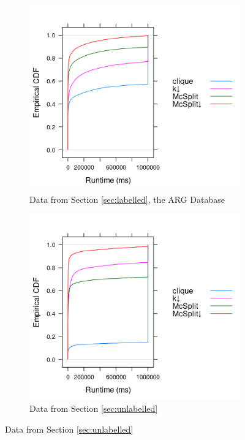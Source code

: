 \documentclass{l4proj}
\theoremstyle{definition}
\theoremstyle{remark}
\begin{document}
\begin{figure} %
  \centering
  \begin{subfigure}[t]{0.49\textwidth}
    \centering
    \includegraphics[scale=0.7]{images/ecdf_mcs.png}
    \caption{Data from Section \ref{sec:labelled}, the ARG Database}
    \label{fig:ecdf_unlabelled_mcs}
  \end{subfigure}
  \begin{subfigure}[t]{0.49\textwidth}
    \centering
    \includegraphics[scale=0.7]{images/ecdf_sip.png}
    \caption{Data from Section \ref{sec:unlabelled}}
    \label{fig:ecdf_unlabelled_sip}
  \end{subfigure}

\end{figure}
\end{document}
